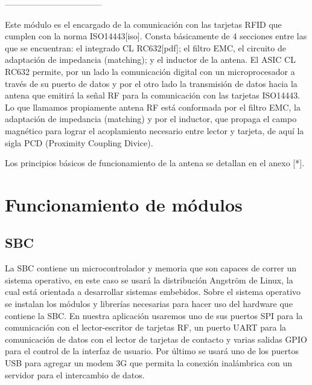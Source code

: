 \bigskip
-----------------------------------
\bigskip

	Este módulo es el encargado de la comunicación con las tarjetas RFID que cumplen con la norma ISO14443[iso]. Consta básicamente de 4 secciones entre las que se encuentran: el integrado CL RC632[pdf]; el filtro EMC, el circuito de adaptación de impedancia (matching); y el inductor de la antena. 
El ASIC CL RC632 permite, por un lado la comunicación digital con un microprocesador a través de su puerto de datos y por el otro lado la transmisión de datos hacia la antena que emitirá la señal RF para la comunicación con las tarjetas ISO14443. 
Lo que llamamos propiamente antena RF está conformada por el filtro EMC, la adaptación de impedancia (matching) y por el inductor, que propaga el campo magnético para lograr el acoplamiento necesario entre lector y tarjeta, de aquí la sigla PCD (Proximity Coupling Divice).

Los principios básicos de funcionamiento de la antena se detallan en el anexo [*].

\section{Funcionamiento de m\'odulos}

\subsection{SBC}
La SBC contiene un microcontrolador y memoria que son capaces de correr un
sistema operativo, en este caso se usará la distribución Angström de Linux, la cual
está orientada a desarrollar sistemas embebidos. Sobre el sistema operativo se
instalan los módulos y librerías necesarias para hacer uso del hardware que contiene
la SBC. En nuestra aplicación usaremos uno de sus puertos SPI para la comunicación
con el lector-escritor de tarjetas RF, un puerto UART para la comunicación de datos
con el lector de tarjetas de contacto y varias salidas GPIO para el control de la
interfaz de usuario. Por último se usará uno de los puertos USB para agregar un
modem 3G que permita la conexión inalámbrica con un servidor para el intercambio
de datos.

